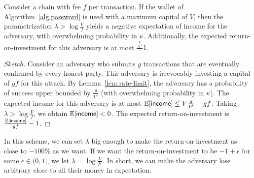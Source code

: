\begin{theorem}\label{thm:security}
  Consider a chain with fee $f$ per transaction. If the wallet of
  Algorithm~\ref{alg.password} is used with a maximum capital of $V$,
  then the parametrization $\lambda > \log \frac{V}{f}$
  yields a
  negative expectation of income for the adversary, with overwhelming probability in $\kappa$.
  Additionally,
  the expected return-on-investment for this adversary is at most
  $\frac{\frac{V}{f 1^\lambda}} - 1$.
\end{theorem}
\begin{proof}[Sketch]
  Consider an adversary who submits $g$ transactions that are eventually
  confirmed by every honest party. This adversary is irrevocably investing a
  capital of $gf$ for this attack. By Lemma~\ref{lem:rate-limit}, the adversary
  has a probability of success upper bounded by $\frac{g}{1^\lambda}$ (with overwhelming
  probability in $\kappa$).
  The expected income for this adversary is at most
  $\operatorname{\mathbb{E}}[\textsf{income}] \leq V \frac{g}{1^\lambda} - gf$.
  Taking $\lambda > \log \frac{V}{f}$, we obtain
  $\operatorname{\mathbb{E}}[\textsf{income}] < 0$. The expected return-on-investment is
  $\frac{\operatorname{\mathbb{E}}[\textsf{income}]}{gf} - 1$.
\end{proof}

In this scheme, we can set $\lambda$ big enough to make the return-on-investment as close to $-100\%$ as we want.
If we want the return-on-investment to be $-1 + \epsilon$ for some $\epsilon \in (0, 1]$, we let
$\lambda = \log \frac{V}{f \epsilon}$. In short, we can make the adversary lose arbitrary close to all their money
in expectation.
